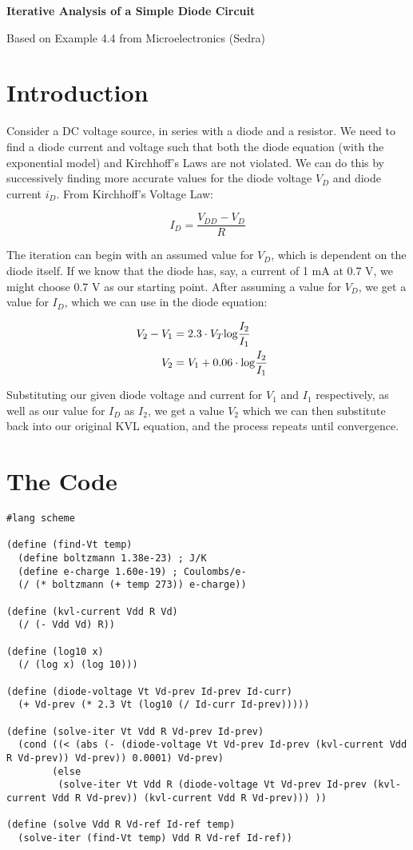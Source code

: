 \documentclass{article}
\begin{document}
\date{}

{\Large
\textbf{Iterative Analysis of a Simple Diode Circuit}}

Based on Example 4.4 from Microelectronics (Sedra)

\section{Introduction}
Consider a DC voltage source, in series with a diode and a resistor. We need to find a diode current and voltage such that both the diode equation (with the exponential model) and Kirchhoff's Laws are not violated. We can do this by successively finding more accurate values for the diode voltage \(V_{D}\) and diode current \(i_{D}\). From Kirchhoff's Voltage Law:

\begin{equation}
I_{D} = \frac{V_{DD} - V_{D}}{R} 
\end{equation}

The iteration can begin with an assumed value for \(V_{D}\), which is dependent on the diode itself. If we know that the diode has, say, a current of 1 mA at 0.7 V, we might choose 0.7 V as our starting point. After assuming a value for \(V_{D}\), we get a value for \(I_{D}\), which we can use in the diode equation:

\begin{align*} V_{2} - V_{1} &= 2.3 \cdot V_{T} \mathrm{log} \frac{I_{2}}{I_{1}} \cr V_{2} &= V_{1} + 0.06 \cdot \mathrm{log} \frac{I_{2}}{I_{1}} \end{align*}

Substituting our given diode voltage and current for \(V_{1}\) and \(I_{1}\) respectively, as well as our value for \(I_{D}\) as \(I_{2}\), we get a value \(V_{2}\) which we can then substitute back into our original KVL equation, and the process repeats until convergence.

\section{The Code}

\begin{lstlisting}
#lang scheme
 
(define (find-Vt temp)
  (define boltzmann 1.38e-23) ; J/K
  (define e-charge 1.60e-19) ; Coulombs/e-
  (/ (* boltzmann (+ temp 273)) e-charge))
 
(define (kvl-current Vdd R Vd)
  (/ (- Vdd Vd) R))
 
(define (log10 x)
  (/ (log x) (log 10)))
 
(define (diode-voltage Vt Vd-prev Id-prev Id-curr)
  (+ Vd-prev (* 2.3 Vt (log10 (/ Id-curr Id-prev))))) 
  
(define (solve-iter Vt Vdd R Vd-prev Id-prev)
  (cond ((< (abs (- (diode-voltage Vt Vd-prev Id-prev (kvl-current Vdd R Vd-prev)) Vd-prev)) 0.0001) Vd-prev)
        (else 
         (solve-iter Vt Vdd R (diode-voltage Vt Vd-prev Id-prev (kvl-current Vdd R Vd-prev)) (kvl-current Vdd R Vd-prev))) ))
 
(define (solve Vdd R Vd-ref Id-ref temp) 
  (solve-iter (find-Vt temp) Vdd R Vd-ref Id-ref))
\end{lstlisting}
 
\end{document}
